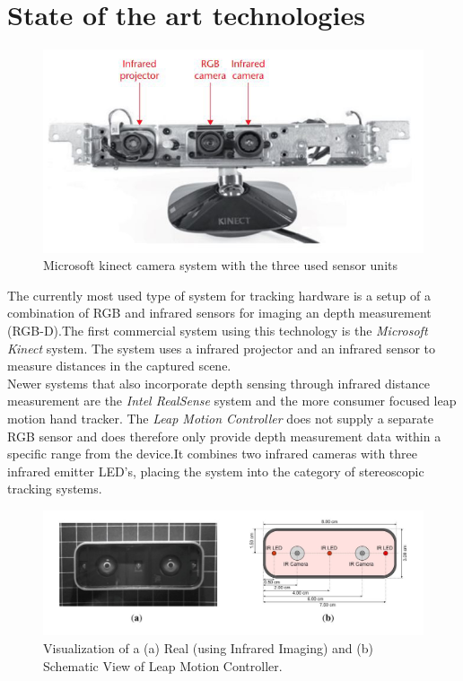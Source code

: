 \section{State of the art technologies}
\begin{figure}
\label{img:kinect}
\includegraphics[width=\textwidth/2]{images/kinnect.JPG} 
\caption{Microsoft kinect camera system with the three used sensor units\cite{Zhang.2012}}
\end{figure}
The currently most used type of system for tracking hardware is a setup of a combination of RGB and infrared sensors for imaging an depth measurement (RGB-D).The first commercial system using this technology is the\textit{ Microsoft Kinect} system\cite{Zhang.2012}. The system uses a infrared projector and an infrared sensor to measure distances in the captured scene.\\
Newer systems that also incorporate depth sensing through infrared distance measurement are the \textit{Intel RealSense} system and the more consumer focused leap motion hand tracker. The\textit{ Leap Motion Controller} does not supply a separate RGB sensor and does therefore only provide depth measurement data within a specific range from the device\cite{Weichert.2013}.It combines two infrared cameras with three infrared emitter LED's, placing the system into the category of stereoscopic tracking systems.
\begin{figure}[H]
\includegraphics[width=\textwidth]{images/leapMotion.JPG}
\caption{Visualization of a (a) Real (using Infrared Imaging) and (b) Schematic View of Leap Motion Controller\cite{Weichert.2013}.}
\label{img:leapMotion} 
\end{figure}
